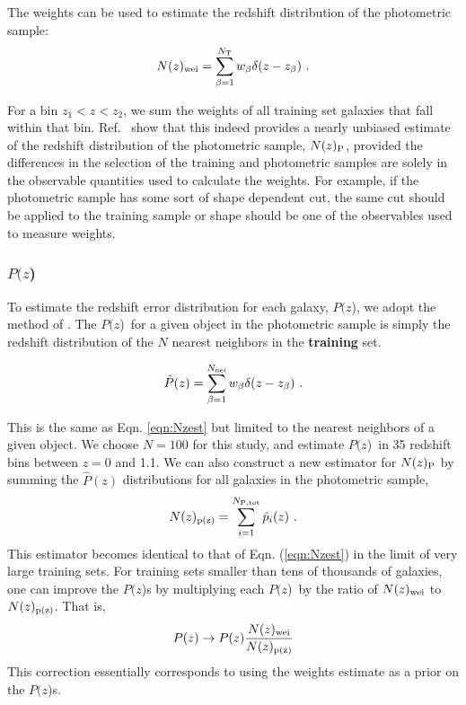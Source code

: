 \documentclass[preprint]{aastex}
\newcommand{\pofz}{$P(z$)}
\newcommand{\nwei}{N(z)_{\rm wei}}
\newcommand{\npz}{N(z)_{\rm p(z)}}
\begin{document}
The weights can be used to estimate the redshift distribution of the
photometric sample:
\begin{equation}  
\nwei = \sum_{\beta=1}^{N_{\rm T}} w_\beta \delta(z-z_\beta)~.
\label{eqn:Nzest}
\end{equation}

\noindent For a bin $z_1 < z < z_2$, we sum the weights of all training
set galaxies that fall within that bin.  
Ref.~\cite{LimaPhotoz08,CunhaPhotoz09} show that this indeed provides
a nearly unbiased estimate of the redshift distribution of the photometric
sample, $N(z)_{\rm P}$, provided the differences in the selection of the
training and photometric samples are solely in the observable quantities used
to calculate the weights.  For example, if the photometric sample
has some sort of shape dependent cut, the same cut should be applied to the
training sample or shape should be one of the observables used to measure
weights.


\subsubsection{\pofz}

To estimate the redshift error distribution for each galaxy, \pofz,
we adopt the method of \cite{CunhaPhotoz09}. The \pofz\ for a given object in the
photometric sample is simply the redshift distribution of the $N$
nearest neighbors in the {\bf training} set.

\begin{equation}
\hat{P}(z) = \sum_{\beta=1}^{N_{\rm nei}} w_\beta \delta(z-z_\beta)~.
\label{eqn:pzest}
\end{equation}

\noindent This is the same as Eqn. \ref{eqn:Nzest} but limited to the nearest
neighbors of a given object.  We choose $N=100$ for this study, and estimate
\pofz\ in 35 redshift bins between $z=0$ and 1.1.  We can also construct a new
estimator for $N(z)_{\rm P}$ by summing the $\hat{P}(z)$ distributions for all
galaxies in the photometric sample,
\begin{equation}
\npz = \sum_{i=1}^{N_{\rm P,tot}}\hat{p}_i(z)~.
\label{eqn:Nhat2}
\end{equation}
\noindent This estimator becomes identical to that of Eqn. (\ref{eqn:Nzest})
in the limit of very large training sets.  For training sets smaller than tens
of thousands of galaxies, one can improve the \pofz s by multiplying each \pofz\ by the
ratio of $\nwei$ to $\npz$.
That is,
\begin{equation} \label{eq:pzcorrect}
P(z) \rightarrow P(z)\frac{\nwei}{\npz} \label{eqn:pzcorrect}
\end{equation}
This correction essentially corresponds to using the weights estimate as a
prior on the \pofz s.
\end{document}
